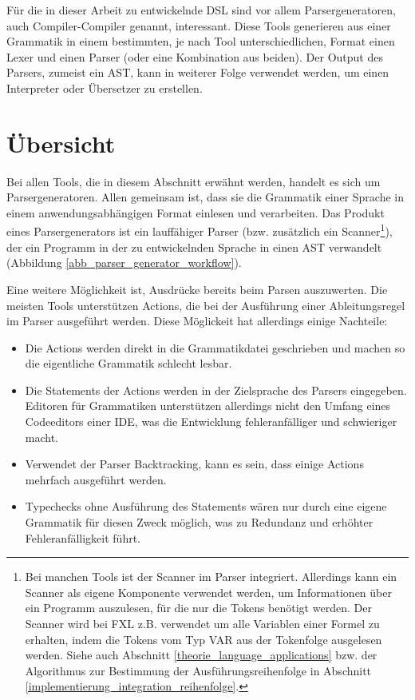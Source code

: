 Für die in dieser Arbeit zu entwickelnde DSL sind vor allem Parsergeneratoren, auch Compiler-Compiler genannt, interessant. Diese Tools generieren aus einer Grammatik in einem bestimmten, je nach Tool unterschiedlichen, Format einen Lexer und einen Parser (oder eine Kombination aus beiden). Der Output des Parsers, zumeist ein AST, kann in weiterer Folge verwendet werden, um einen Interpreter oder Übersetzer zu erstellen.


\section{Übersicht}

Bei allen Tools, die in diesem Abschnitt erwähnt werden, handelt es sich um Parsergeneratoren. Allen gemeinsam ist, dass sie die Grammatik einer Sprache in einem anwendungsabhängigen Format einlesen und verarbeiten. Das Produkt eines Parsergenerators ist ein lauffähiger  Parser (bzw. zusätzlich ein Scanner\footnote{Bei manchen Tools ist der Scanner im Parser integriert. Allerdings kann ein Scanner als eigene Komponente verwendet werden, um Informationen über ein Programm auszulesen, für die nur die Tokens benötigt werden. Der Scanner wird bei FXL z.B. verwendet um alle Variablen einer Formel zu erhalten, indem die Tokens vom Typ VAR aus der Tokenfolge ausgelesen werden. Siehe auch Abschnitt \ref{theorie_language_applications} bzw. der Algorithmus zur Bestimmung der Ausführungsreihenfolge in Abschnitt \ref{implementierung_integration_reihenfolge}.}), der ein Programm in der zu entwickelnden Sprache in einen AST verwandelt (Abbildung \ref{abb_parser_generator_workflow}). 

Eine weitere Möglichkeit ist, Ausdrücke bereits beim Parsen auszuwerten. Die meisten Tools unterstützen Actions, die bei der Ausführung einer Ableitungsregel im Parser ausgeführt werden. Diese Möglickeit hat allerdings einige Nachteile:

\begin{itemize}
  \item Die Actions werden direkt in die Grammatikdatei geschrieben und machen so die eigentliche Grammatik schlecht lesbar.
  \item Die Statements der Actions werden in der Zielsprache des Parsers eingegeben. Editoren für Grammatiken unterstützen allerdings nicht den Umfang eines Codeeditors einer IDE, was die Entwicklung fehleranfälliger und schwieriger macht.
  \item Verwendet der Parser Backtracking, kann es sein, dass einige Actions mehrfach ausgeführt werden.
  \item Typechecks ohne Ausführung des Statements wären nur durch eine eigene Grammatik für diesen Zweck möglich, was zu Redundanz und erhöhter Fehleranfälligkeit führt.
\end{itemize}

